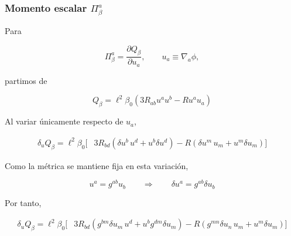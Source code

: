 \documentclass{beamer}
\newcommand{\DenseDisplaySpacing}{%
\setlength{\abovedisplayskip}{1pt}%
\setlength{\belowdisplayskip}{1pt}%
\setlength{\abovedisplayshortskip}{0pt}%
\setlength{\belowdisplayshortskip}{0pt}%
\setlength{\jot}{1pt}%
}
\begin{document}

\begin{frame}[label=nav-frame-106]
\frametitle{Momento escalar \(\Pi_\beta^a\)}
\small
\linespread{.94}\selectfont\DenseDisplaySpacing

Para

\[
\Pi_\beta^a
=
\frac{\partial Q_\beta}{\partial u_a},
\qquad
u_a\equiv\nabla_a\phi,
\]

partimos de

\[
Q_\beta
=
\ell^2\beta_0
\left(
3R_{ab}u^a u^b
-
Ru^a u_a
\right)
\]

Al variar únicamente respecto de \(u_a\),

\begin{align*}
\delta_u Q_\beta
=
\ell^2\beta_0
\Big[
&3R_{bd}
\left(
\delta u^b\,u^d
+
u^b\delta u^d
\right)
-
R\left(
\delta u^m\,u_m
+
u^m\delta u_m
\right)
\Big]
\end{align*}

Como la métrica se mantiene fija en esta variación,

\[
u^a=g^{ab}u_b
\qquad\Longrightarrow\qquad
\boxed{
\delta u^a=g^{ab}\delta u_b
}
\]

Por tanto,

\begin{align*}
\delta_u Q_\beta
=
\ell^2\beta_0
\Big[
&3R_{bd}
\left(
g^{bm}\delta u_m\,u^d
+
u^b g^{dm}\delta u_m
\right)
-
R\left(
g^{mn}\delta u_n\,u_m
+
u^m\delta u_m
\right)
\Big]
\end{align*}

\end{frame}
\end{document}
